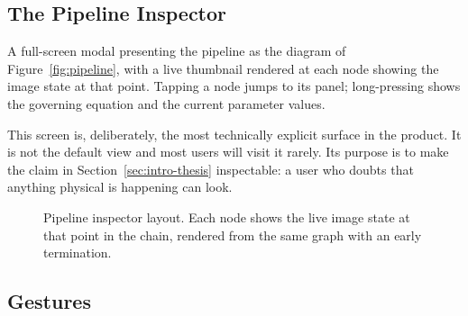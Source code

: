 \subsection{The Pipeline Inspector}

A full-screen modal presenting the pipeline as the diagram of
Figure~\ref{fig:pipeline}, with a live thumbnail rendered at each node showing
the image state at that point. Tapping a node jumps to its panel; long-pressing
shows the governing equation and the current parameter values.

This screen is, deliberately, the most technically explicit surface in the
product. It is not the default view and most users will visit it rarely. Its
purpose is to make the claim in Section~\ref{sec:intro-thesis} inspectable: a
user who doubts that anything physical is happening can look.

\begin{figure}[htbp]
\centering
{}
\caption{Pipeline inspector layout. Each node shows the live image state at that point in the chain, rendered from the same graph with an early termination.}
\label{fig:inspector}
\end{figure}

\subsection{Gestures}

